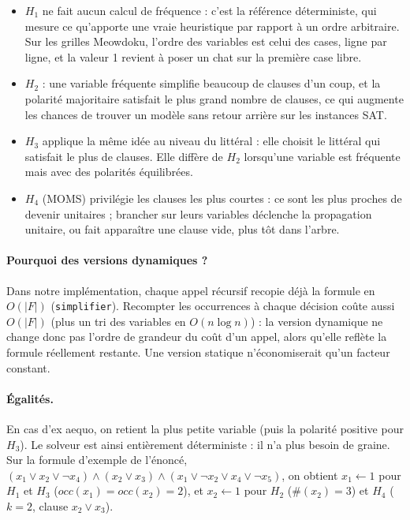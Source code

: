 \documentclass[11pt,a4paper]{article}
\begin{document}
\begin{itemize}
  \item \textbf{$H_1$} ne fait aucun calcul de fréquence : c'est la référence déterministe, qui
        mesure ce qu'apporte une vraie heuristique par rapport à un ordre arbitraire. Sur les
        grilles Meowdoku, l'ordre des variables est celui des cases, ligne par ligne, et la
        valeur 1 revient à poser un chat sur la première case libre.
  \item \textbf{$H_2$} : une variable fréquente simplifie beaucoup de clauses d'un coup, et la
        polarité majoritaire satisfait le plus grand nombre de clauses, ce qui augmente les
        chances de trouver un modèle sans retour arrière sur les instances SAT.
  \item \textbf{$H_3$} applique la même idée au niveau du littéral : elle choisit le littéral
        qui satisfait le plus de clauses. Elle diffère de $H_2$ lorsqu'une variable est fréquente
        mais avec des polarités équilibrées.
  \item \textbf{$H_4$} (MOMS) privilégie les clauses les plus courtes : ce sont les plus proches
        de devenir unitaires ; brancher sur leurs variables déclenche la propagation unitaire, ou
        fait apparaître une clause vide, plus tôt dans l'arbre.
\end{itemize}

\paragraph{Pourquoi des versions dynamiques ?} Dans notre implémentation, chaque appel récursif
recopie déjà la formule en $O(|F|)$ (\texttt{simplifier}). Recompter les occurrences à chaque
décision coûte aussi $O(|F|)$ (plus un tri des variables en $O(n\log n)$) : la version dynamique
ne change donc pas l'ordre de grandeur du coût d'un appel, alors qu'elle reflète la formule
réellement restante. Une version statique n'économiserait qu'un facteur constant.

\paragraph{Égalités.} En cas d'ex aequo, on retient la plus petite variable (puis la polarité
positive pour $H_3$). Le solveur est ainsi entièrement déterministe : il n'a plus besoin de
graine. Sur la formule d'exemple de l'énoncé,
$(x_1\vee x_2\vee\neg x_4)\wedge(x_2\vee x_3)\wedge(x_1\vee\neg x_2\vee x_4\vee\neg x_5)$, on
obtient $x_1\leftarrow1$ pour $H_1$ et $H_3$ ($\mathit{occ}(x_1)=\mathit{occ}(x_2)=2$), et
$x_2\leftarrow1$ pour $H_2$ ($\#(x_2)=3$) et $H_4$ ($k=2$, clause $x_2\vee x_3$).
\end{document}
